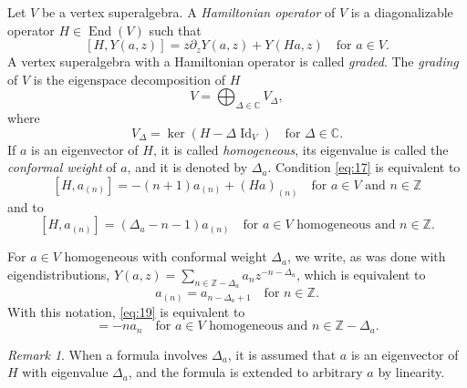 \documentclass[a4paper, 12pt, reqno]{amsart}
\theoremstyle{remark}
\newtheorem{remark}[theorem]{Remark}
\numberwithin{equation}{subsection}
\DeclareMathOperator{\Id}{Id}
\DeclareMathOperator{\End}{End}
\begin{document}
Let $V$ be a vertex superalgebra.
A \emph{Hamiltonian operator} of $V$ is a diagonalizable operator $H \in \End(V)$ such that
\begin{equation}
  \label{eq:17}
  [H, Y(a, z)] = z\partial_zY(a, z) + Y(Ha, z) \quad \text{for }a \in V.
\end{equation}
A vertex superalgebra with a Hamiltonian operator is called \emph{graded}.
The \emph{grading} of $V$ is the eigenspace decomposition of $H$
\begin{equation*}
  V = \bigoplus_{\Delta \in \mathbb{C}}V_{\Delta},
\end{equation*}
where
\begin{equation*}
  V_{\Delta} = \ker(H - \Delta\Id_V) \quad \text{for }\Delta \in \mathbb{C}.
\end{equation*}
If $a$ is an eigenvector of $H$, it is called \emph{homogeneous}, its eigenvalue is called the \emph{conformal weight} of $a$, and it is denoted by $\Delta_a$.
Condition \eqref{eq:17} is equivalent to
\begin{equation}
  \label{eq:18}
  [H, a_{(n)}] = -(n + 1)a_{(n)} + (Ha)_{(n)} \quad \text{for }a \in V\text{ and }n \in \mathbb{Z}
\end{equation}
and to
\begin{equation}
  \label{eq:19}
  [H, a_{(n)}] = (\Delta_a - n - 1)a_{(n)} \quad \text{for }a \in V\text{ homogeneous and }n \in \mathbb{Z}.
\end{equation}

For $a \in V$ homogeneous with conformal weight $\Delta_a$, we write, as was done with eigendistributions, $Y(a, z) = \sum_{n \in \mathbb{Z} - \Delta_a}a_nz^{-n - \Delta_a}$, which is equivalent to
\begin{equation*}
  a_{(n)} = a_{n - \Delta_a + 1} \quad \text{for }n \in \mathbb{Z}.
\end{equation*}
With this notation, \eqref{eq:19} is equivalent to
\begin{equation*}
  [H, a_n] = -na_n \quad \text{for }a \in V\text{ homogeneous and }n \in \mathbb{Z} - \Delta_a.
\end{equation*}

\begin{remark}
  \label{rmk:18}
  When a formula involves $\Delta_a$, it is assumed that $a$ is an eigenvector of $H$ with eigenvalue $\Delta_a$, and the formula is extended to arbitrary $a$ by linearity.
\end{remark}
\end{document}
